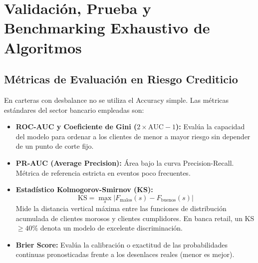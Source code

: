 \documentclass[11pt,a4paper]{article}
\begin{document}
\section{Validación, Prueba y Benchmarking Exhaustivo de Algoritmos}

\subsection{Métricas de Evaluación en Riesgo Crediticio}
En carteras con desbalance no se utiliza el Accuracy simple. Las métricas estándares del sector bancario empleadas son:
\begin{itemize}
    \item \textbf{ROC-AUC y Coeficiente de Gini ($2 \times \text{AUC} - 1$):} Evalúa la capacidad del modelo para ordenar a los clientes de menor a mayor riesgo sin depender de un punto de corte fijo.
    \item \textbf{PR-AUC (Average Precision):} Área bajo la curva Precision-Recall. Métrica de referencia estricta en eventos poco frecuentes.
    \item \textbf{Estadístico Kolmogorov-Smirnov (KS):}
    \begin{equation}
    \text{KS} = \max_{s} |F_{\text{malos}}(s) - F_{\text{buenos}}(s)|
    \end{equation}
    Mide la distancia vertical máxima entre las funciones de distribución acumulada de clientes morosos y clientes cumplidores. En banca retail, un KS $\ge 40\%$ denota un modelo de excelente discriminación.
    \item \textbf{Brier Score:} Evalúa la calibración o exactitud de las probabilidades continuas pronosticadas frente a los desenlaces reales (menor es mejor).
\end{itemize}
\end{document}
